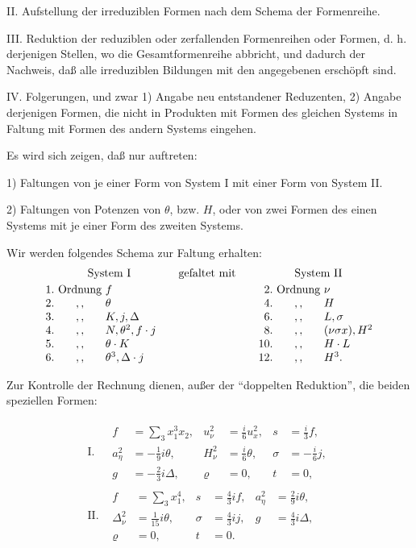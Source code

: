 \documentclass[11pt]{article}
\newcommand{\A}{\Delta}
\begin{document}
II. Aufstellung der irreduziblen Formen nach dem Schema der Formenreihe.

III. Reduktion der reduziblen oder zerfallenden Formenreihen oder Formen, d. h. derjenigen Stellen, wo die Gesamtformenreihe abbricht, und dadurch der Nachweis, daß alle irreduziblen Bildungen mit den angegebenen erschöpft sind.

IV. Folgerungen, und zwar 1) Angabe neu entstandener Reduzenten, 2) Angabe derjenigen Formen, die nicht in Produkten mit Formen des gleichen Systems in Faltung mit Formen des andern Systems eingehen.

Es wird sich zeigen, daß nur auftreten:

1) Faltungen von je einer Form von System I mit einer Form von System II.

2) Faltungen von Potenzen von $\theta$, bzw. $H$, oder von zwei Formen des einen Systems mit je einer Form des zweiten Systems.

Wir werden folgendes Schema zur Faltung erhalten:
\[
\begin{array}{r@{\ }c@{\ }l@{\qquad}c@{\qquad}r@{\ }c@{\ }l}
\multicolumn{3}{c}{\text{System I}} & \text{gefaltet mit} & \multicolumn{3}{c}{\text{System II}}\\[0.25em]
1. & \text{Ordnung} & f & & 2. & \text{Ordnung} & \nu\\
2. & ,, & \theta & & 4. & ,, & H\\
3. & ,, & K,j,\A & & 6. & ,, & L,\sigma\\
4. & ,, & N,\theta^2,f\cdot j & & 8. & ,, & (\nu\sigma x),H^2\\
5. & ,, & \theta\cdot K & & 10. & ,, & H\cdot L\\
6. & ,, & \theta^3,\A\cdot j & & 12. & ,, & H^3.
\end{array}
\]

Zur Kontrolle der Rechnung dienen, außer der ``doppelten Reduktion'', die beiden speziellen Formen:


\[
\begin{array}{ll}
\text{I.}&\begin{array}{rlrlrl}
f&=\displaystyle\sum_3x_1^3x_2,& u_\nu^2&=\frac{i}{6}u_x^2,& s&=\frac{i}{3}f,\\
a_\eta^2&=-\frac19 i\theta,& H_\nu^2&=\frac{i}{6}\theta,& \sigma&=-\frac{i}{6}j,\\
g&=-\frac23i\Delta,& \varrho&=0,& t&=0,
\end{array}\\[1.2em]
\text{II.}&\begin{array}{rlrlrl}
f&=\displaystyle\sum_3x_1^4,& s&=\frac43if,& a_\eta^2&=\frac29i\theta,\\
\Delta_\nu^2&=\frac1{15}i\theta,& \sigma&=\frac43ij,& g&=\frac43i\Delta,\\
\varrho&=0,& t&=0.
\end{array}
\end{array}
\]
\end{document}
